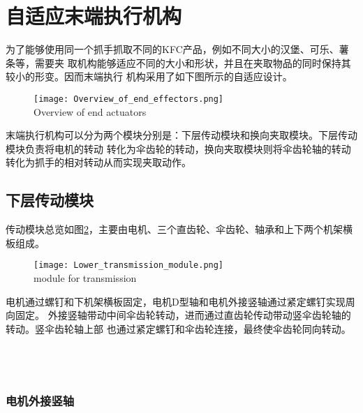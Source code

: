 


\section{自适应末端执行机构}

为了能够使用同一个抓手抓取不同的KFC产品，例如不同大小的汉堡、可乐、薯条等，需要夹
取机构能够适应不同的大小和形状，并且在夹取物品的同时保持其较小的形变。因而末端执行
机构采用了如下图所示的自适应设计。

\begin{figure}[!htp]
  \centering
  \texttt{[image: Overview\_of\_end\_effectors.png]} \\
    {Overview of end actuators}
  \label{fig:末端执行机构总览}
\end{figure}

末端执行机构可以分为两个模块分别是：下层传动模块和换向夹取模块。下层传动模块负责将电机的转动
转化为伞齿轮的转动，换向夹取模块则将伞齿轮轴的转动转化为抓手的相对转动从而实现夹取动作。



\subsection{下层传动模块}

传动模块总览如图\ref{fig:下部传动模块}，主要由电机、三个直齿轮、伞齿轮、轴承和上下两个机架横板组成。

\begin{figure}[!htp]
  \centering
  \texttt{[image: Lower\_transmission\_module.png]} \\
    {module for transmission}
  \label{fig:下部传动模块}
\end{figure}

电机通过螺钉和下机架横板固定，电机D型轴和电机外接竖轴通过紧定螺钉实现周向固定。
外接竖轴带动中间伞齿轮转动，进而通过直齿轮传动带动竖伞齿轮轴的转动。竖伞齿轮轴上部
也通过紧定螺钉和伞齿轮连接，最终使伞齿轮同向转动。
\\
\\ 
\\
\\

\subsubsection{电机外接竖轴}


